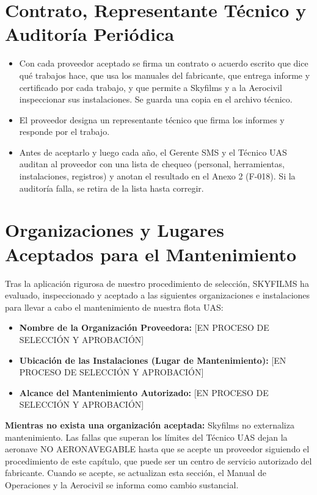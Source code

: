 \section{Contrato, Representante Técnico y Auditoría Periódica}
\begin{itemize}
    \item Con cada proveedor aceptado se firma un contrato o acuerdo escrito que dice qué trabajos hace, que usa los manuales del fabricante, que entrega informe y certificado por cada trabajo, y que permite a Skyfilms y a la Aerocivil inspeccionar sus instalaciones. Se guarda una copia en el archivo técnico.
    \item El proveedor designa un representante técnico que firma los informes y responde por el trabajo.
    \item Antes de aceptarlo y luego cada año, el Gerente SMS y el Técnico UAS auditan al proveedor con una lista de chequeo (personal, herramientas, instalaciones, registros) y anotan el resultado en el Anexo 2 (F-018). Si la auditoría falla, se retira de la lista hasta corregir.
\end{itemize}

\section{Organizaciones y Lugares Aceptados para el Mantenimiento}
Tras la aplicación rigurosa de nuestro procedimiento de selección, SKYFILMS ha evaluado, inspeccionado y aceptado a las siguientes organizaciones e instalaciones para llevar a cabo el mantenimiento de nuestra flota UAS:

\begin{itemize}
    \item \textbf{Nombre de la Organización Proveedora:} [EN PROCESO DE SELECCIÓN Y APROBACIÓN]

    \item \textbf{Ubicación de las Instalaciones (Lugar de Mantenimiento):} [EN PROCESO DE SELECCIÓN Y APROBACIÓN]

    \item \textbf{Alcance del Mantenimiento Autorizado:} [EN PROCESO DE SELECCIÓN Y APROBACIÓN]
\end{itemize}

\textbf{Mientras no exista una organización aceptada:} Skyfilms no externaliza mantenimiento. Las fallas que superan los límites del Técnico UAS dejan la aeronave NO AERONAVEGABLE hasta que se acepte un proveedor siguiendo el procedimiento de este capítulo, que puede ser un centro de servicio autorizado del fabricante. Cuando se acepte, se actualizan esta sección, el Manual de Operaciones y la Aerocivil se informa como cambio sustancial.
